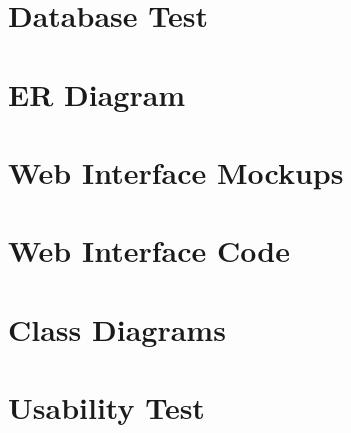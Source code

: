     \section{Database Test}
      \label{app:dbTest}
      
    \section{ER Diagram}
    \label{errDiagram}
      
    \section{Web Interface Mockups}
      
            \label{app:Mock}
    \section{Web Interface Code}
    	
    	      \label{webIHTML}

    \section{Class Diagrams}
    \label{app:Class-diagrams}
      
    
   \section{Usability Test}
      
      \label{app:quest}



\appendix
\listoffigures
\listoftables
\lstlistoflistings


